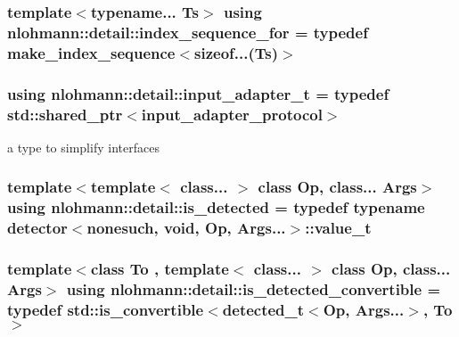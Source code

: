 \subsubsection[{\texorpdfstring{index\+\_\+sequence\+\_\+for}{index_sequence_for}}]{\setlength{\rightskip}{0pt plus 5cm}template$<$typename... Ts$>$ using {\bf nlohmann\+::detail\+::index\+\_\+sequence\+\_\+for} = typedef {\bf make\+\_\+index\+\_\+sequence}$<$sizeof...(Ts)$>$}\hypertarget{namespacenlohmann_1_1detail_a24800493c6ec02ce033dcbb47b7fd28e}{}\label{namespacenlohmann_1_1detail_a24800493c6ec02ce033dcbb47b7fd28e}
\subsubsection[{\texorpdfstring{input\+\_\+adapter\+\_\+t}{input_adapter_t}}]{\setlength{\rightskip}{0pt plus 5cm}using {\bf nlohmann\+::detail\+::input\+\_\+adapter\+\_\+t} = typedef std\+::shared\+\_\+ptr$<${\bf input\+\_\+adapter\+\_\+protocol}$>$}\hypertarget{namespacenlohmann_1_1detail_ae132f8cd5bb24c5e9b40ad0eafedf1c2}{}\label{namespacenlohmann_1_1detail_ae132f8cd5bb24c5e9b40ad0eafedf1c2}


a type to simplify interfaces 

\subsubsection[{\texorpdfstring{is\+\_\+detected}{is_detected}}]{\setlength{\rightskip}{0pt plus 5cm}template$<$template$<$ class... $>$ class Op, class... Args$>$ using {\bf nlohmann\+::detail\+::is\+\_\+detected} = typedef typename {\bf detector}$<${\bf nonesuch}, {\bf void}, Op, Args...$>$\+::{\bf value\+\_\+t}}\hypertarget{namespacenlohmann_1_1detail_a9135fcf616d6ac6e231a86e0a055ac44}{}\label{namespacenlohmann_1_1detail_a9135fcf616d6ac6e231a86e0a055ac44}
\subsubsection[{\texorpdfstring{is\+\_\+detected\+\_\+convertible}{is_detected_convertible}}]{\setlength{\rightskip}{0pt plus 5cm}template$<$class To , template$<$ class... $>$ class Op, class... Args$>$ using {\bf nlohmann\+::detail\+::is\+\_\+detected\+\_\+convertible} = typedef std\+::is\+\_\+convertible$<${\bf detected\+\_\+t}$<$Op, Args...$>$, To$>$}\hypertarget{namespacenlohmann_1_1detail_a5262e531c46e357b33007060f294673b}{}\label{namespacenlohmann_1_1detail_a5262e531c46e357b33007060f294673b}
